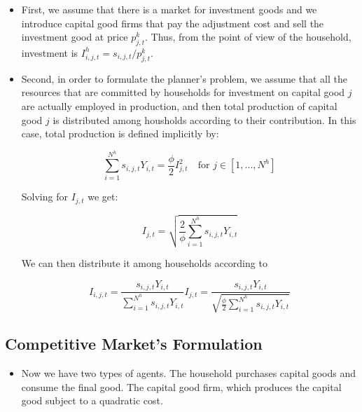 \documentclass[11pt,english]{article}
\begin{document}
\begin{itemize}
	\begin{itemize}
		\item First, we assume that there is a market for investment goods and we introduce capital good firms that pay the adjustment cost and sell the investment good at price $p^k_{j,t}$. Thus, from the point of view of the household, investment is $I^h_{i,j,t} = s_{i,j,t}/p^k_{j,t}$.   \medskip
		
		\item Second, in order to formulate the planner's problem, we assume that all the resources that are committed by households for investment on capital good $j$ are actually employed in production, and then total production of capital good $j$ is distributed among housholds according to their contribution. In this case, total production is defined implicitly by:
		
		$$\sum_{i=1}^{N^h} s_{i,j,t} Y_{i,t} = \frac{\phi}{2} I_{j,t}^2 \quad \text{for } j \in [1,...,N^h]$$
		
		Solving for $I_{j,t}$ we get:
		
		$$I_{j,t} =  \sqrt{\frac{2}{\phi} \sum_{i=1}^{N^h} s_{i,j,t} Y_{i,t}}$$
		
		We can then distribute it among households according to
		
		$$I_{i,j,t} = \frac{s_{i,j,t}Y_{i,t}}{ \sum_{i=1}^{N^h} s_{i,j,t} Y_{i,t}}  I_{j,t} =   \frac{s_{i,j,t}Y_{i,t}}{\sqrt{\frac{\phi}{2} \sum_{i=1}^{N^h} s_{i,j,t} Y_{i,t}}}$$
		
	\end{itemize}  
\end{itemize}


\subsection{Competitive Market's Formulation}

\begin{itemize}
	\item Now we have two types of agents.  The household purchases capital goods and consume the final good.  The capital good firm, which produces the capital good subject to a quadratic cost. 
\end{itemize}
\end{document}
